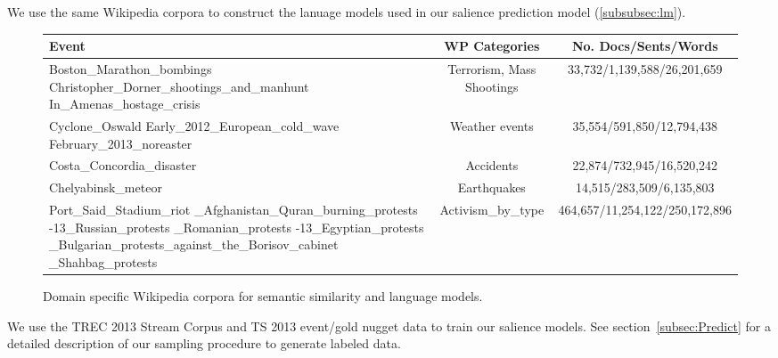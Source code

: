 \documentclass{sig-alternate}
\begin{document}
We use the same Wikipedia corpora to construct the lanuage models used
in our salience prediction model (\cref{subsubsec:lm}). 

\begin{figure*}
	\begin{center}
\begin{tabular}{| p{5cm} c c |}
\hline
Event & WP Categories & No. Docs/Sents/Words\\
\hline \hline
Boston\_Marathon\_bombings \newline
Christopher\_Dorner\_shootings\_and\_manhunt \newline 
 In\_Amenas\_hostage\_crisis
& Terrorism, Mass Shootings & 33,732/1,139,588/26,201,659  \\
\hline
 Cyclone\_Oswald \newline
Early\_2012\_European\_cold\_wave \newline
February\_2013\_noreaster \newline & Weather events & 35,554/591,850/12,794,438  \\
\hline
Costa\_Concordia\_disaster & Accidents & 22,874/732,945/16,520,242 \\
\hline
Chelyabinsk\_meteor & Earthquakes & 14,515/283,509/6,135,803  \\
\hline
Port\_Said\_Stadium\_riot \newline
2012\_Afghanistan\_Quran\_burning\_protests \newline
2011-13\_Russian\_protests \newline
2012\_Romanian\_protests \newline
2012-13\_Egyptian\_protests \newline
2013\_Bulgarian\_protests\_against\_the\_Borisov\_cabinet \newline
2013\_Shahbag\_protests & Activism\_by\_type & 464,657/11,254,122/250,172,896  \\
\hline
\end{tabular}
\caption{Domain specific Wikipedia corpora for semantic similarity and 
language models. }
\end{center}
\end{figure*} 


We use the TREC 2013 Stream Corpus and TS 2013 event/gold nugget data to 
train our salience models. See section~\cref{subsec:Predict} 
for a detailed description of our sampling procedure to generate labeled
data.
\end{document}

